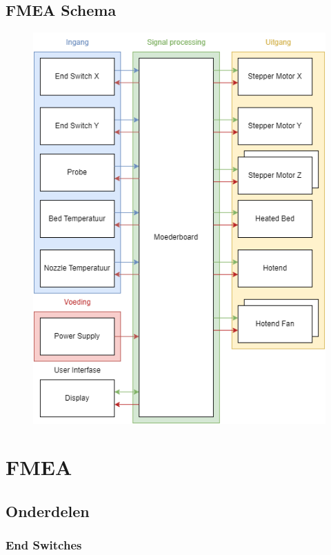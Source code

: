 \documentclass{article}
\begin{document}
\subsection{FMEA Schema}
\begin{figure}[H]
  \centering
  \includegraphics[width=\textwidth]{Creality Ender V2.drawio.png}
\end{figure}


\newpage

\section{FMEA}

\subsection{Onderdelen}
\subsubsection*{End Switches}
\end{document}
